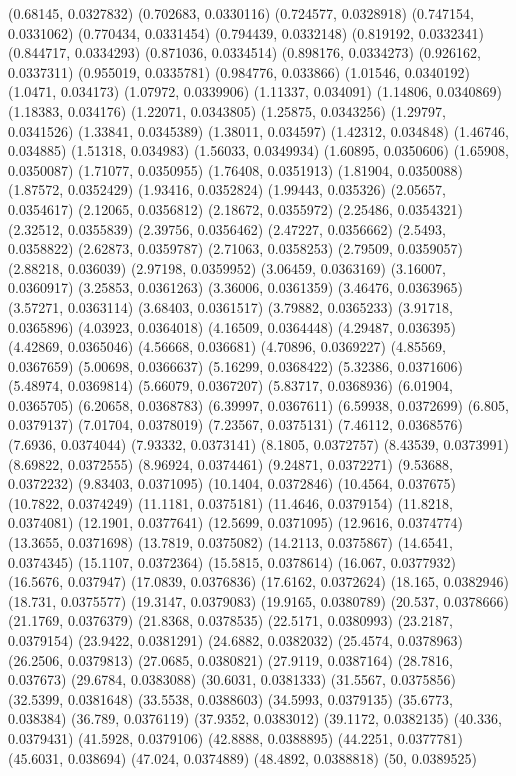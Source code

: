 {(0.68145, 0.0327832)
(0.702683, 0.0330116)
(0.724577, 0.0328918)
(0.747154, 0.0331062)
(0.770434, 0.0331454)
(0.794439, 0.0332148)
(0.819192, 0.0332341)
(0.844717, 0.0334293)
(0.871036, 0.0334514)
(0.898176, 0.0334273)
(0.926162, 0.0337311)
(0.955019, 0.0335781)
(0.984776, 0.033866)
(1.01546, 0.0340192)
(1.0471, 0.034173)
(1.07972, 0.0339906)
(1.11337, 0.034091)
(1.14806, 0.0340869)
(1.18383, 0.034176)
(1.22071, 0.0343805)
(1.25875, 0.0343256)
(1.29797, 0.0341526)
(1.33841, 0.0345389)
(1.38011, 0.034597)
(1.42312, 0.034848)
(1.46746, 0.034885)
(1.51318, 0.034983)
(1.56033, 0.0349934)
(1.60895, 0.0350606)
(1.65908, 0.0350087)
(1.71077, 0.0350955)
(1.76408, 0.0351913)
(1.81904, 0.0350088)
(1.87572, 0.0352429)
(1.93416, 0.0352824)
(1.99443, 0.035326)
(2.05657, 0.0354617)
(2.12065, 0.0356812)
(2.18672, 0.0355972)
(2.25486, 0.0354321)
(2.32512, 0.0355839)
(2.39756, 0.0356462)
(2.47227, 0.0356662)
(2.5493, 0.0358822)
(2.62873, 0.0359787)
(2.71063, 0.0358253)
(2.79509, 0.0359057)
(2.88218, 0.036039)
(2.97198, 0.0359952)
(3.06459, 0.0363169)
(3.16007, 0.0360917)
(3.25853, 0.0361263)
(3.36006, 0.0361359)
(3.46476, 0.0363965)
(3.57271, 0.0363114)
(3.68403, 0.0361517)
(3.79882, 0.0365233)
(3.91718, 0.0365896)
(4.03923, 0.0364018)
(4.16509, 0.0364448)
(4.29487, 0.036395)
(4.42869, 0.0365046)
(4.56668, 0.036681)
(4.70896, 0.0369227)
(4.85569, 0.0367659)
(5.00698, 0.0366637)
(5.16299, 0.0368422)
(5.32386, 0.0371606)
(5.48974, 0.0369814)
(5.66079, 0.0367207)
(5.83717, 0.0368936)
(6.01904, 0.0365705)
(6.20658, 0.0368783)
(6.39997, 0.0367611)
(6.59938, 0.0372699)
(6.805, 0.0379137)
(7.01704, 0.0378019)
(7.23567, 0.0375131)
(7.46112, 0.0368576)
(7.6936, 0.0374044)
(7.93332, 0.0373141)
(8.1805, 0.0372757)
(8.43539, 0.0373991)
(8.69822, 0.0372555)
(8.96924, 0.0374461)
(9.24871, 0.0372271)
(9.53688, 0.0372232)
(9.83403, 0.0371095)
(10.1404, 0.0372846)
(10.4564, 0.037675)
(10.7822, 0.0374249)
(11.1181, 0.0375181)
(11.4646, 0.0379154)
(11.8218, 0.0374081)
(12.1901, 0.0377641)
(12.5699, 0.0371095)
(12.9616, 0.0374774)
(13.3655, 0.0371698)
(13.7819, 0.0375082)
(14.2113, 0.0375867)
(14.6541, 0.0374345)
(15.1107, 0.0372364)
(15.5815, 0.0378614)
(16.067, 0.0377932)
(16.5676, 0.037947)
(17.0839, 0.0376836)
(17.6162, 0.0372624)
(18.165, 0.0382946)
(18.731, 0.0375577)
(19.3147, 0.0379083)
(19.9165, 0.0380789)
(20.537, 0.0378666)
(21.1769, 0.0376379)
(21.8368, 0.0378535)
(22.5171, 0.0380993)
(23.2187, 0.0379154)
(23.9422, 0.0381291)
(24.6882, 0.0382032)
(25.4574, 0.0378963)
(26.2506, 0.0379813)
(27.0685, 0.0380821)
(27.9119, 0.0387164)
(28.7816, 0.037673)
(29.6784, 0.0383088)
(30.6031, 0.0381333)
(31.5567, 0.0375856)
(32.5399, 0.0381648)
(33.5538, 0.0388603)
(34.5993, 0.0379135)
(35.6773, 0.038384)
(36.789, 0.0376119)
(37.9352, 0.0383012)
(39.1172, 0.0382135)
(40.336, 0.0379431)
(41.5928, 0.0379106)
(42.8888, 0.0388895)
(44.2251, 0.0377781)
(45.6031, 0.038694)
(47.024, 0.0374889)
(48.4892, 0.0388818)
(50, 0.0389525)
}

